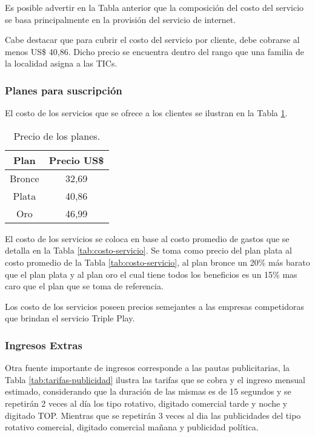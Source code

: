 \begin{itemize}
Es posible advertir en la Tabla anterior que la composición del costo del servicio
se basa principalmente en la provisión del servicio de internet.

Cabe destacar que para cubrir el costo del servicio por cliente, debe cobrarse al menos US\$ 40,86.
Dicho precio se encuentra dentro del rango que una familia de la localidad asigna a las TICs.

\subsubsection{Planes para suscripción}
El costo de los servicios que se ofrece a los clientes se ilustran en la Tabla \ref{tab:precio-planes}.


\begin{table}[H]
  \centering
    \begin{tabular}{|c|c|}
    \hline
    \rowcolor[rgb]{ .773,  .851,  .945} \textbf{Plan} & \textbf{Precio US\$} \bigstrut\\
    \hline
    Bronce & 32,69 \bigstrut\\
    \hline
    Plata & 40,86 \bigstrut\\
    \hline
    Oro   & 46,99 \bigstrut\\
    \hline
    \end{tabular}%
    \caption{Precio de los planes.}
  \label{tab:precio-planes}%
\end{table}%


El costo de los servicios se coloca en base al costo promedio de gastos que se detalla en la Tabla \ref{tab:costo-servicio}. Se toma como precio del plan plata al costo promedio de la Tabla \ref{tab:costo-servicio}, al plan bronce un 20\% más barato que el plan plata y al plan oro el cual tiene todos los beneficios es un 15\% mas caro que el plan que se toma de referencia. 

Los costo de los servicios poseen precios semejantes a las  empresas competidoras que brindan el servicio
Triple Play.


\subsubsection{Ingresos Extras}
Otra fuente importante de ingresos corresponde a las pautas publicitarias, la Tabla \ref{tab:tarifas-publicidad} ilustra las tarifas
que se cobra y el ingreso mensual estimado, considerando que la duración de las mismas es de 15 segundos
y se repetirán 2 veces al día los tipo rotativo, digitado comercial tarde y noche y digitado TOP. Mientras que se repetirán 3 veces al dia las publicidades del tipo rotativo comercial, digitado comercial mañana y publicidad política.




\end{itemize}
